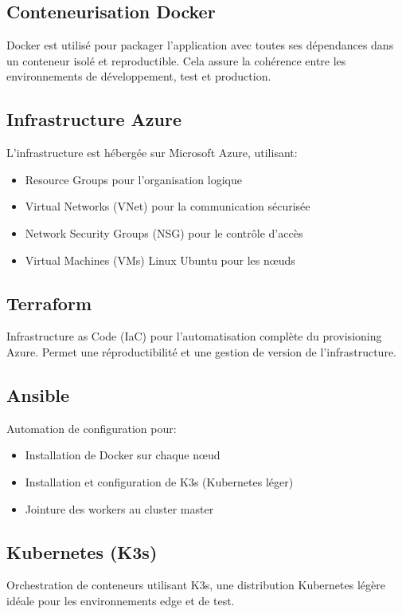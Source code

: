 \documentclass[12pt,a4paper,twoside]{report}
\begin{document}
\subsection{Conteneurisation Docker}
Docker est utilisé pour packager l'application avec toutes ses dépendances dans un conteneur isolé et reproductible. Cela assure la cohérence entre les environnements de développement, test et production.

\subsection{Infrastructure Azure}
L'infrastructure est hébergée sur Microsoft Azure, utilisant:
\begin{itemize}
    \item Resource Groups pour l'organisation logique
    \item Virtual Networks (VNet) pour la communication sécurisée
    \item Network Security Groups (NSG) pour le contrôle d'accès
    \item Virtual Machines (VMs) Linux Ubuntu pour les nœuds
\end{itemize}

\subsection{Terraform}
Infrastructure as Code (IaC) pour l'automatisation complète du provisioning Azure. Permet une réproductibilité et une gestion de version de l'infrastructure.

\subsection{Ansible}
Automation de configuration pour:
\begin{itemize}
    \item Installation de Docker sur chaque nœud
    \item Installation et configuration de K3s (Kubernetes léger)
    \item Jointure des workers au cluster master
\end{itemize}

\subsection{Kubernetes (K3s)}
Orchestration de conteneurs utilisant K3s, une distribution Kubernetes légère idéale pour les environnements edge et de test.
\end{document}
